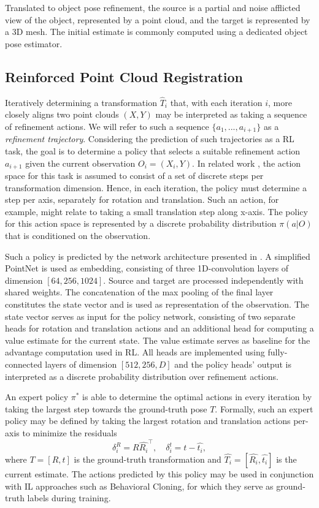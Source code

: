 \documentclass[10pt,twocolumn,letterpaper]{article}
\begin{document}
Translated to object pose refinement, the source is a partial and noise afflicted view of the object, represented by a point cloud, and the target is represented by a 3D mesh. The initial estimate is commonly computed using a dedicated object pose estimator.

\subsection{Reinforced Point Cloud Registration} Iteratively determining a transformation $\hat{T}_i$ that, with each iteration $i$, more closely aligns two point clouds $(X,Y)$ may be interpreted as taking a sequence of refinement actions. We will refer to such a sequence $\{a_1,...,a_{i+1}\}$ as a \textit{refinement trajectory}. Considering the prediction of such trajectories as a RL task, the goal is to determine a policy that selects a suitable refinement action $a_{i+1}$ given the current observation $O_i=(X_i,Y)$. In related work \cite{shao2020pfrl,bauer2021reagent}, the action space for this task is assumed to consist of a set of discrete steps per transformation dimension. Hence, in each iteration, the policy must determine a step per axis, separately for rotation and translation. Such an action, for example, might relate to taking a small translation step along x-axis. The policy for this action space is represented by a discrete probability distribution $\pi(a|O)$ that is conditioned on the observation.

Such a policy is predicted by the network architecture presented in \cite{bauer2021reagent}. A simplified PointNet \cite{qi2017pointnet} is used as embedding, consisting of three 1D-convolution layers of dimension $[64,256,1024]$. Source and target are processed independently with shared weights. The concatenation of the max pooling of the final layer constitutes the state vector and is used as representation of the observation. The state vector serves as input for the policy network, consisting of two separate heads for rotation and translation actions and an additional head for computing a value estimate for the current state. The value estimate serves as baseline for the advantage computation used in RL. All heads are implemented using fully-connected layers of dimension $[512,256,D]$ and the policy heads' output is interpreted as a discrete probability distribution over refinement actions.

An expert policy $\pi^*$ is able to determine the optimal actions in every iteration by taking the largest step towards the ground-truth pose $T$. Formally, such an expert policy may be defined \cite{bauer2021reagent} by taking the largest rotation and translation actions per-axis to minimize the residuals
\begin{equation}\label{eq:expert}
    \delta^R_i = R \hat{R_i}^\top, \quad \delta^t_i = t - \hat{t_i},
\end{equation}
where $T=[R,t]$ is the ground-truth transformation and $\hat{T_i}=[\hat{R_i},\hat{t_i}]$ is the current estimate. The actions predicted by this policy may be used in conjunction with IL approaches such as Behavioral Cloning, for which they serve as ground-truth labels during training.
\end{document}
